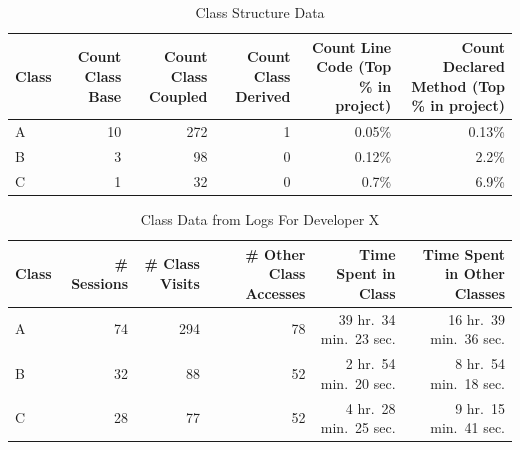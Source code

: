 \begin{table}[!t]
    \renewcommand{\arraystretch}{1.3}
	\centering
	\caption{Class Structure Data}
	\begin{tabular}{lrrrrr}
	\toprule
\textbf{Class} & \textbf{Count Class Base} & \textbf{Count Class Coupled} & \textbf{Count Class Derived} & \textbf{Count Line Code} {(Top \% in project)} & \textbf{Count Declared Method} {(Top \% in project)}\\
\midrule
 A & 10 & 272 & 1 & 0.05\% & 0.13\%\\
 B & 3 & 98 & 0 & 0.12\% & 2.2\%\\
 C & 1 & 32 & 0 & 0.7\% & 6.9\%\\
\bottomrule
	\end{tabular}
	\label{fig:ClassStructureAnalysisData}
\end{table}

\begin{table}[!t]
    \renewcommand{\arraystretch}{1.3}
	\centering
	\caption{Class Data from Logs For Developer X}
	\begin{tabular}{lrrrrr}
	\toprule
\textbf{Class} & \textbf{\# Sessions} & \textbf{\# Class Visits} & \textbf{\# Other Class Accesses} & \textbf{Time Spent in Class} & \textbf{Time Spent in Other Classes}\\
\midrule
A & 74 & 294 & 78 & 39 hr.\ 34 min.\ 23 sec. & 16 hr.\ 39 min.\ 36 sec.\\
B & 32 & 88 & 52 & 2 hr.\ 54 min.\ 20 sec. & 8 hr.\ 54 min.\ 18 sec.\\
C & 28 & 77 & 52 & 4 hr.\ 28 min.\ 25 sec. & 9 hr.\ 15 min.\ 41 sec.\\
\bottomrule
	\end{tabular}
	\label{fig:ClassAnalysisData}
\end{table}



